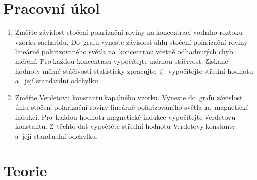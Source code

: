 \documentclass{../concepts/titul_protokol_p/prepareprotokol} %
\begin{document}
\renewcommand{\figurename}{Graf}
\renewcommand{\refname}{Literatura}
\renewcommand{\today}{\number\day.\,\number\month.\,\number\year}

\graphicspath{{../concepts/titul_protokol_p/}}
\maketitle

\section{Pracovní úkol}
\begin{enumerate}
    \item Změřte závislost stočení polarizační roviny na koncentraci vodního roztoku vzorku sacharidu. 
    Do~grafu vyneste závislost úhlu stočení polarizační roviny lineárně polarizovaného světla na~koncentraci 
    včetně odhadnutých chyb měření. Pro každou koncentraci vypočítejte měrnou stáčivost. Získané hodnoty měrné 
    stáčivosti statisticky zpracujte, tj. vypočítejte střední hodnotu a ~její standardní odchylku.
    \item Změřte Verdetovu konstantu kapalného vzorku. Vyneste do~grafu závislost úhlu stočení polarizační 
    roviny lineárně polarizovaného světla na~magnetické indukci. Pro~každou hodnotu magnetické indukce 
    vypočítejte Verdetovu konstantu. Z~těchto dat vypočtěte střední hodnotu Verdetovy konstanty a~její standardní 
    odchylku.
\end{enumerate}

\vspace{-3mm}
\section{Teorie}
\end{document}
